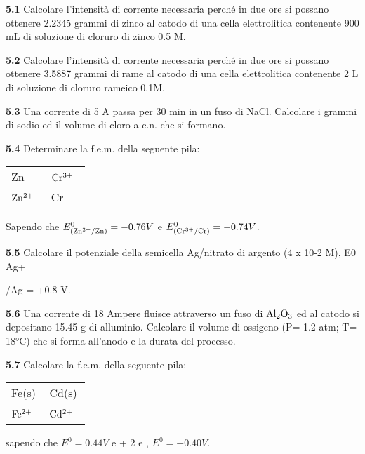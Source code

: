 \textbf{5.1} Calcolare l’intensità di corrente necessaria perché in due ore si possano ottenere 2.2345 grammi di zinco al catodo di una cella elettrolitica contenente 900 mL di soluzione di cloruro di zinco 0.5 M.

\vspace{0.2cm}\textbf{5.2} Calcolare l’intensità di corrente necessaria perché in due ore si possano ottenere 3.5887 grammi di rame al catodo di una cella elettrolitica contenente 2 L di soluzione di cloruro rameico 0.1M.

\vspace{0.2cm}\textbf{5.3} Una corrente di 5 A passa per 30 min in un fuso di NaCl. Calcolare i grammi di sodio ed il
volume di cloro a c.n. che si formano.

\vspace{0.2cm}\textbf{5.4} Determinare la f.e.m. della seguente pila:

\begin{center}
    \begin{tabular}{|p{3.7cm}||p{3.7cm}|}
         Zn & $\rm Cr^{3+}$ \, \\[0.5ex]
         $\rm Zn^{2+}$ \,  & Cr\\[0.5ex]
    \end{tabular}
\end{center}

Sapendo che $E^{0}_{(\rm Zn^{2+}/Zn)}=-0.76V$ e $E^{0}_{(\rm Cr^{3+}/Cr)}=-0.74V$.

\vspace{0.2cm}\textbf{5.5} Calcolare il potenziale della semicella Ag/nitrato di argento (4 x 10-2 M), E0 Ag+

/Ag = +0.8 V.

\vspace{0.2cm}\textbf{5.6} Una corrente di 18 Ampere fluisce attraverso un fuso di $\rm Al_2O_3$ ed al catodo si depositano 15.45 g
di alluminio. Calcolare il volume di ossigeno (P= 1.2 atm; T= 18°C) che si forma all’anodo e la
durata del processo.

\vspace{0.2cm}\textbf{5.7} Calcolare la f.e.m. della seguente pila:

\begin{center}
    \begin{tabular}{|p{3.7cm}||p{3.7cm}|}
         Fe(s) & Cd(s)\\[0.5ex]
         $\rm Fe^{2+}$ \, \big[0.0120-M\big] & $\rm Cd^{2+}$ \, \big[0.8988-M\big] \\[0.5ex]
    \end{tabular}
\end{center}

sapendo che   $E^0=0.44V$ e  + 2 e , $E^0=-0.40V$.
